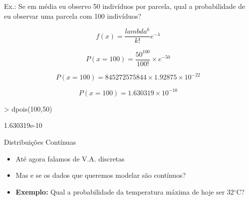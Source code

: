 \documentclass{beamer}
\begin{document}
\begin{frame}[fragile]


Ex.: Se em média eu observo 50 indivíduos por parcela, qual a probabilidade de eu observar uma parcela com 100 indivíduos?

\begin{equation*}
  f(x) = \frac{lambda^k}{k!} e^{-\lambda}
\end{equation*}

\begin{equation*}
  P(x=100) = \frac{50^{100}}{100!} \times e^{-50}
\end{equation*}

\begin{equation*}
  P(x=100) = 845272575844 \times  1.92875 \times 10^{-22}
\end{equation*}

\begin{equation*}
  P(x=100) = 1.630319 \times 10^{-10}
\end{equation*}

\begin{Schunk}
\begin{Sinput}
> dpois(100,50)
\end{Sinput}
\begin{Soutput}
[1] 1.630319e-10
\end{Soutput}
\end{Schunk}



\end{frame} 


\begin{frame}{Distribuições Contínuas}

\begin{itemize}
  \item Até agora falamos de V.A. discretas
  \item Mas e se os dados que queremos modelar são contínuos?
  \item \textbf{Exemplo:} Qual a probabilidade da temperatura máxima de hoje ser 32$^\circ$C?
\end{itemize}

\end{frame} 
\end{document}
